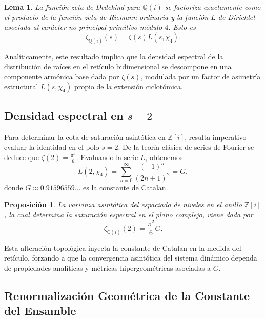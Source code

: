 \documentclass{article}
\numberwithin{equation}{section}
\theoremstyle{plain}
\newtheorem{lema}[teorema]{Lema}
\newtheorem{proposicion}[teorema]{Proposición}
\theoremstyle{definition}
\begin{document}
\begin{lema}
La función zeta de Dedekind para $\mathbb{Q}(i)$ se factoriza exactamente como el producto de la función zeta de Riemann ordinaria y la función $L$ de Dirichlet asociada al carácter no principal primitivo módulo $4$. Esto es
\begin{equation}
    \zeta_{\mathbb{Q}(i)}(s) = \zeta(s) L(s, \chi_4).
\end{equation}
\end{lema}

Analíticamente, este resultado implica que la densidad espectral de la distribución de raíces en el retículo bidimensional se descompone en una componente armónica base dada por $\zeta(s)$, modulada por un factor de asimetría estructural $L(s, \chi_4)$ propio de la extensión ciclotómica.

\subsection{Densidad espectral en \texorpdfstring{$s=2$}{s=2}}

Para determinar la cota de saturación asintótica en $\mathbb{Z}[i]$, resulta imperativo evaluar la identidad en el polo $s=2$. De la teoría clásica de series de Fourier se deduce que $\zeta(2) = \frac{\pi^2}{6}$. Evaluando la serie $L$, obtenemos
\begin{equation}
    L(2, \chi_4) = \sum_{n=0}^{\infty} \frac{(-1)^n}{(2n+1)^2} = G,
\end{equation}
donde $G \approx 0.91596559\dots$ es la constante de Catalan.

\begin{proposicion}
La varianza asintótica del espaciado de niveles en el anillo $\mathbb{Z}[i]$, la cual determina la saturación espectral en el plano complejo, viene dada por
\begin{equation}
    \zeta_{\mathbb{Q}(i)}(2) = \frac{\pi^2}{6} G.
\end{equation}
\end{proposicion}

Esta alteración topológica inyecta la constante de Catalan en la medida del retículo, forzando a que la convergencia asintótica del sistema dinámico dependa de propiedades analíticas y métricas hipergeométricas asociadas a $G$.

\subsection{Renormalización Geométrica de la Constante del Ensamble}
\end{document}
